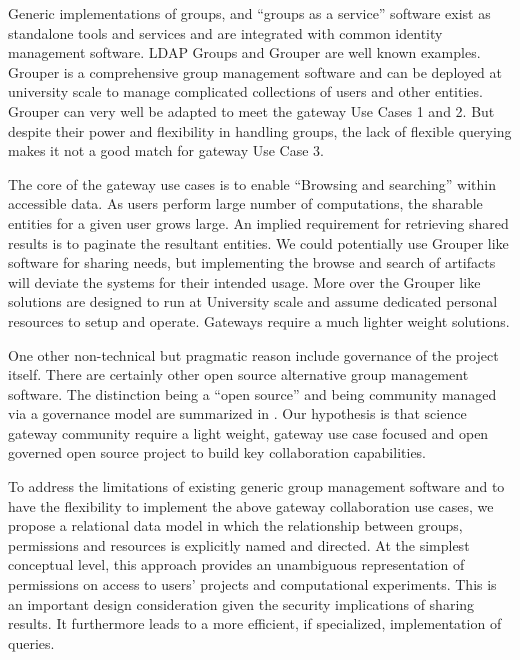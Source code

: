 \documentclass[sigconf]{acmart}
\begin{document}
Generic implementations of groups, and ``groups as a service'' software exist as standalone tools and services and are integrated with common identity management software. LDAP Groups \cite{aclLDAP} and Grouper \cite{grouperWebsite} are well known examples. Grouper is a comprehensive group management software and can be deployed at university scale to manage complicated collections of users and other entities. Grouper can very well be adapted to meet the gateway Use Cases 1 and 2. But despite their power and flexibility in handling groups, the lack of flexible querying makes it not a good match for gateway Use Case 3.

The core of the gateway use cases is to enable ``Browsing and searching'' within accessible data. As users perform large number of computations, the sharable entities for a given user grows large. An implied requirement for retrieving shared results is to paginate the resultant entities. We could potentially use Grouper like software for sharing needs, but implementing the browse and search of artifacts will deviate the systems for their intended usage. More over the Grouper like solutions are designed to run at University scale and assume dedicated personal resources to setup and operate. Gateways require a much lighter weight solutions. 

One other non-technical but pragmatic reason include governance of the project itself. There are certainly other open source alternative group management software. The distinction being a ``open source'' and being community managed via a governance model are summarized in \cite{o2007governance}. Our hypothesis is that science gateway community require a light weight, gateway use case focused and open governed open source project to build  key collaboration capabilities. 

To address the limitations of existing generic group management software and to have the flexibility to implement the above gateway collaboration use cases, we propose a relational data model in which the relationship between groups, permissions and resources is explicitly named and directed. At the simplest conceptual level, this approach provides an unambiguous representation of permissions on access to users' projects and computational experiments. This is an important design consideration given the security implications of sharing results. It furthermore leads to a more efficient, if specialized, implementation of queries.
\end{document}
